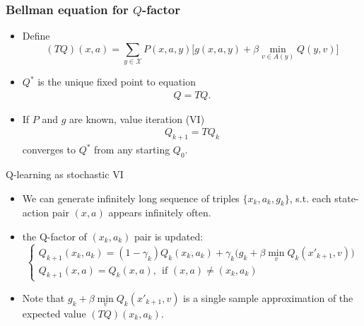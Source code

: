\documentclass{beamer}
\def\X{{\mathcal X}}
\begin{document}
\begin{frame}
  \frametitle{Bellman equation for $Q$-factor}
  \begin{itemize}
  \item Define
    \begin{equation*}
(T Q)(x, a) = \sum\limits_{y \in \X} P(x, a, y)\Big[g(x, a, y)+\beta \min\limits_{v\in A(y)} Q(y, v) \Big]
\end{equation*}
\item $Q^*$ is the unique fixed point to equation
  \begin{align*}
    Q = T Q.
  \end{align*}

\item If $P$ and $g$ are known, value iteration (VI)
  \begin{align*}
    Q_{k+1} = TQ_k
  \end{align*}
   converges to $Q^*$ from any starting $Q_0.$
  \end{itemize}
\end{frame}

\begin{frame}{ Q-learning as stochastic VI}

\begin{itemize}
  \item We can generate infinitely long sequence of triples $\{x_k, a_k, g_k\}$, s.t. each state-action pair $(x,a)$ appears infinitely often.

  

  \item the Q-factor of $(x_k, a_k)$ pair is updated:
  \begin{equation*}
  \begin{cases}
 Q_{k+1}(x_k, a_k) =(1- \gamma_k)Q_{k}(x_k, a_k)  + \gamma_k \Big(
  g_k + \beta \min\limits_{v}Q_k(x'_{k+1}, v)\Big)\\
   Q_{k+1}(x, a) = Q_{k}(x, a),~~\text{if }(x, a)\neq (x_k, a_k)
  \end{cases}
  \end{equation*}


  \item Note that $g_k + \beta \min\limits_{v}Q_k(x'_{k+1}, v)$ is a single sample approximation of the expected value $(TQ)(x_k, a_k).$
\end{itemize}
\end{frame}
\end{document}
